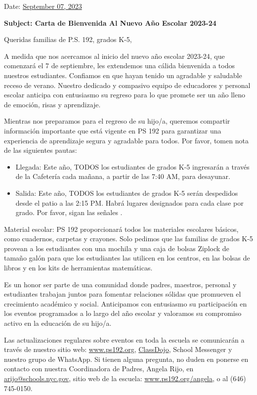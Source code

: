 \documentclass[12pt,letterpaper]{article}
\begin{document}
\vspace*{0.5in}
Date: \href{https://www.ps192.org/apps/bbmessages/show_bbm.jsp?REC_ID=139439}{September 07, 2023} 

\textbf{Subject: Carta de Bienvenida Al Nuevo Año Escolar 2023-24}

Queridas familias de P.S. 192, grados K-5,

A medida que nos acercamos al inicio del nuevo año escolar 2023-24, que comenzará el 7 de septiembre, les extendemos una cálida bienvenida a todos nuestros estudiantes. Confiamos
en que hayan tenido un agradable y saludable receso de verano. Nuestro dedicado y
compasivo equipo de educadores y personal escolar anticipa con entusiasmo su regreso para
lo que promete ser un año lleno de emoción, risas y aprendizaje.

Mientras nos preparamos para el regreso de su hijo/a, queremos compartir información
importante que está vigente en PS 192 para garantizar una experiencia de aprendizaje 
segura y agradable para todos. Por favor, tomen nota de las siguientes pautas:
	\begin{itemize}
	\item Llegada: Este año, TODOS los estudiantes de grados K-5 ingresarán a través de la
	Cafetería cada mañana, a partir de las 7:40 AM, para desayunar.
	\item Salida: Este año, TODOS los estudiantes de grados K-5 serán despedidos desde el
	patio a las 2:15 PM. Habrá lugares designados para cada clase por grado. Por favor,
	sigan las señales .
	\end{itemize}
		
Material escolar: PS 192 proporcionará todos los materiales escolares básicos, como 
cuadernos, carpetas y crayones. Solo pedimos que las familias de grados K-5 provean a los
estudiantes con una mochila y una caja de bolsas Ziplock de tamaño galón para que los 
estudiantes las utilicen en los centros, en las bolsas de libros y en los kits de herramientas matemáticas.

Es un honor ser parte de una comunidad donde padres, maestros, personal y estudiantes
trabajan juntos para fomentar relaciones sólidas que promueven el crecimiento académico y
social. Anticipamos con entusiasmo su participación en los eventos programados a lo largo
del año escolar y valoramos su compromiso activo en la educación de su hijo/a.

Las actualizaciones regulares sobre eventos en toda la escuela se comunicarán a través de
nuestro sitio web: \url{www.ps192.org}, \href{https://www.classdojo.com/}{ClassDojo}, School Messenger y nuestro grupo de WhatsApp. Si tienen alguna pregunta, no duden en ponerse en contacto con nuestra Coordinadora de Padres, Angela Rijo, en 
\url{arijo@schools.nyc.gov}, sitio web de la escuela: \url{www.ps192.org/angela}, o al (646) 745-0150.
\end{document}

